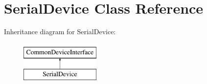 \hypertarget{class_serial_device}{}\section{Serial\+Device Class Reference}
\label{class_serial_device}
Inheritance diagram for Serial\+Device\+:\begin{figure}[H]
\begin{center}
\leavevmode
\includegraphics[height=2.000000cm]{class_serial_device}
\end{center}
\end{figure}
